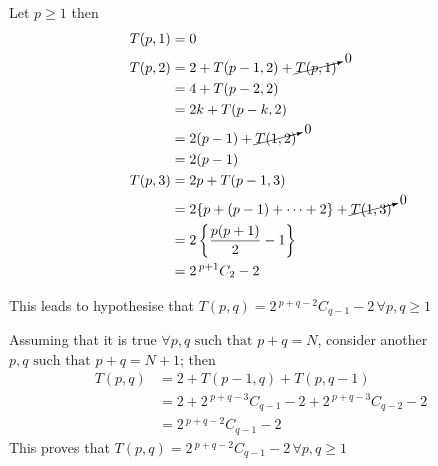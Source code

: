 \documentclass[answers]{exam}
\begin{document}
\begin{questions}
{\begin{parts}
{\begin{solution}
\begin{itemize}
{                            Let \(p \geq 1\) then
                            \begin{equation*}
                                \begin{aligned}
                                    T(p, 1) &= 0\\
                                    T(p, 2) &= 2 + T(p - 1, 2) + \cancelto{0}{T(p, 1)}\\
                                            &= 4 + T(p - 2, 2)\\
                                            &= 2k + T(p - k, 2)\\
                                            &= 2(p - 1) + \cancelto{0}{T(1, 2)}\\
                                            &= 2(p - 1)\\
                                    T(p, 3) &= 2p + T(p - 1, 3) \\
                                            &= 2 \{p + (p - 1) + \cdots + 2\} + \cancelto{0}{T(1, 3)}\\
                                            &= 2 \left\{\frac{p(p+1)}{2} - 1\right\} \\
                                            &= 2 \,^{p + 1}C_2 - 2
                                \end{aligned}
                            \end{equation*}

                            This leads to hypothesise that \(T(p, q) = 2 \, ^{p + q - 2}C_{q - 1} - 2 \,\forall p, q \geq 1\)

                            Assuming that it is true \(\forall p, q \text{ such that } p + q = N\), consider another \(p, q \text{ such
                            that } p + q = N + 1\); then
                            \begin{equation*}
                                \begin{aligned}
                                    T(p, q) &= 2 + T(p - 1, q) + T(p, q - 1) \\
                                            &= 2 + 2 \,^{p + q - 3}C_{q - 1} - 2 + 2 \,^{p + q - 3}C_{q - 2} - 2 \\
                                            &= 2 \, ^{p + q - 2}C_{q - 1} - 2
                                \end{aligned}
                            \end{equation*}
                            This proves that \(T(p, q) = 2 \, ^{p + q - 2}C_{q - 1} - 2 \,\forall p, q \geq 1\)

}
\end{itemize}
\end{solution}}
\end{parts}}
\end{questions}
\end{document}
